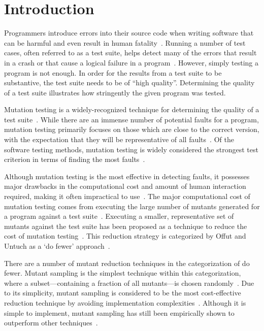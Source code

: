 
\section{Introduction}

Programmers introduce errors into their source code when writing software
that can be harmful and even result in human fatality~\cite{vicente2003programming}.
Running a number of test cases, often referred to as a test suite, helps detect many of the errors
that result in a crash or that cause a logical failure in a program~\cite{wagner2005comparing}.
However, simply testing a program is not enough. In order for the results
from a test suite to be substantive, the test suite needs to be of ``high quality''.
Determining the quality of a test suite illustrates how stringently the given
program was tested.

Mutation testing is a widely-recognized technique for determining the quality
of a test suite~\cite{gopinath2015mutation}. While there are an immense number
of potential faults for a program, mutation testing primarily focuses on those
which are close to the correct version, with the expectation that they will
be representative of all faults~\cite{jia2011analysis}.
Of the software testing methods, mutation testing is widely considered the strongest
test criterion in terms of finding the most faults~\cite{ammann2008introduction}.

Although mutation testing is the most effective in detecting faults, it possesses
major drawbacks in the computational cost and amount of human interaction required, making it
often impractical to use~\cite{gopinath2015mutation, wong1995reducing, gopinath2015empirical}.
The major computational cost of mutation testing comes from executing the large number of mutants generated for a
program against a test suite~\cite{offutt1993experimental}. Executing a smaller, representative
set of mutants against the test suite has been proposed as a technique to reduce
the cost of mutation testing~\cite{jia2011analysis, wong1995reducing, offutt1993experimental, offutt2001mutation}.
This reduction strategy is categorized by Offut and Untuch as a `do fewer' approach~\cite{offutt2001mutation}.

There are a number of mutant reduction techniques in the categorization of do fewer.
Mutant sampling is the simplest technique within this categorization, where a
subset---containing a fraction of all mutants---is chosen randomly~\cite{wong1995reducing}.
Due to its simplicity, mutant sampling is considered to be the most cost-effective
reduction technique by avoiding implementation complexities~\cite{gopinath2015mutation}.
Although it is simple to implement, mutant sampling has still been empirically shown
to outperform other techniques~\cite{zhang2010operator}.

